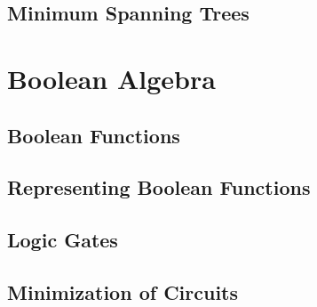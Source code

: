 \documentclass{article}
\begin{document}
\subsection{Minimum Spanning Trees }

\section{Boolean Algebra}

\subsection{Boolean Functions}
\subsection{Representing Boolean Functions}
\subsection{Logic Gates}
\subsection{Minimization of Circuits}
\end{document}
